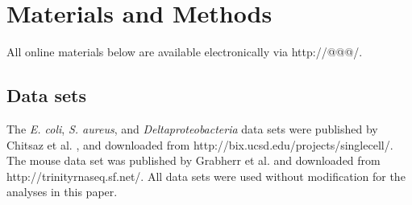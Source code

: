 \documentclass[10pt]{article}
\begin{document}





% 
% 
% 




\section*{Materials and Methods}

All online materials below are available electronically via http://@@@/.

\subsection*{Data sets}

The {\em E. coli}, {\em S. aureus}, and {\em Deltaproteobacteria} data sets
were published by Chitsaz et al. \cite{pubmed21926975}, and downloaded
from http://bix.ucsd.edu/projects/singlecell/.  The mouse data set was
published by Grabherr et al. \cite{pubmed21572440} and downloaded
from http://trinityrnaseq.sf.net/.  All data sets were used without
modification for the analyses in this paper.
\end{document}
